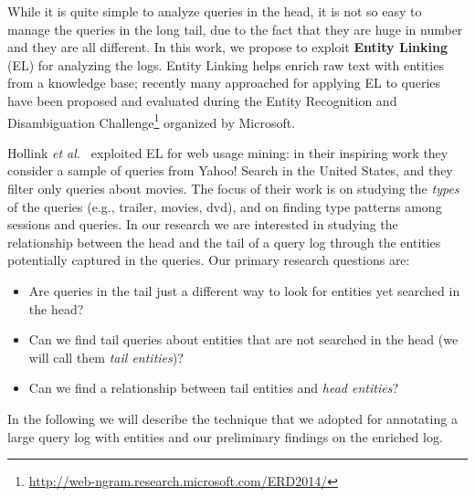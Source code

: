 
While it is quite simple to analyze queries in the head, it is not so easy to manage the queries in the long tail, 
due to the fact that they are huge in number and they are all different. In this work, we propose
to exploit \textbf{Entity Linking} (EL) for analyzing the logs. Entity Linking helps enrich raw text with entities 
from a knowledge base; recently many approached for applying 
EL to queries have been proposed and evaluated during the Entity Recognition and Disambiguation Challenge\footnote{
\url{http://web-ngram.research.microsoft.com/ERD2014/}} organized by Microsoft. 

Hollink \emph{et al.}~\cite{hollink2013web} exploited EL for web usage mining: 
in their inspiring work they consider a sample of 
queries from Yahoo! Search in the United States, and they filter only queries about movies. The focus
of their work is on studying the \emph{types} of the queries (e.g., trailer, movies, dvd), and on finding
type patterns among sessions and queries. In our research we are interested in studying the 
relationship between the head and the tail of a query log
through the entities potentially captured in the queries. Our primary research questions are:
\begin{itemize}
	\item Are queries in the tail just a different way to look for entities yet searched in the head? 
	\item Can we find tail queries about entities that are not searched in the head (we will call them \emph{tail entities})?
	\item Can we find a relationship between tail entities and \emph{head entities}?  
\end{itemize} 

In the following we will describe the technique that we adopted for annotating a large query log with entities 
and our preliminary findings on the enriched log.


 
